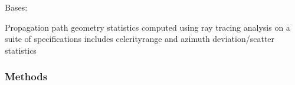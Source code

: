 \documentclass[letterpaper,10pt,english]{sphinxmanual}
\begin{document}
\begin{fulllineitems}
\label{\detokenize{stochprop.propagation:stochprop.propagation.PathGeometryModel}}
Bases: 

Propagation path geometry statistics computed using ray tracing
analysis on a suite of specifications includes celerity\sphinxhyphen{}range and
azimuth deviation/scatter statistics
\subsubsection*{Methods}


\begin{savenotes}\sphinxatlongtablestart\begin{longtable}[c]{}
\hline

\endfirsthead

%
{}\\
\hline

\endhead

\hline
{}\\
\endfoot

\endlastfoot


\end{longtable}
\end{savenotes}
\end{fulllineitems}
\end{document}
